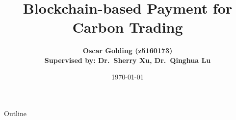 \documentclass[xcolor=table]{beamer}
\title{Blockchain-based Payment for Carbon Trading}
\author[Oscar Golding]
{\textbf{Oscar Golding (z5160173)
\texorpdfstring{\\} 
\footnotesize Supervised by: Dr.~Sherry Xu, Dr.~Qinghua Lu}}
\institute[UNSW]{Thesis B: UNSW}
\date{\today}
\begin{document}
\begin{frame}
    \titlepage
\end{frame}

\begin{frame}{Outline}
    \tableofcontents
\end{frame}












\end{document}
